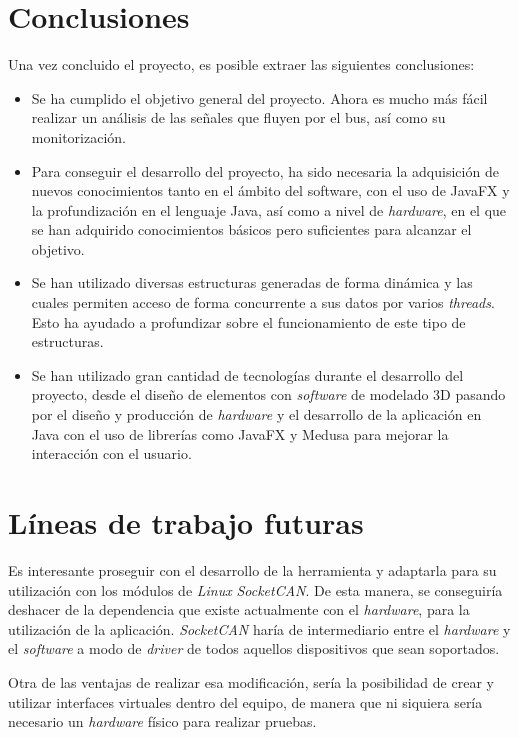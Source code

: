 
\section{Conclusiones}\label{conclusiones}

Una vez concluido el proyecto, es posible extraer las siguientes conclusiones:
\begin{itemize}
\item
Se ha cumplido el objetivo general del proyecto. Ahora es mucho más fácil realizar un análisis de las señales que fluyen por el bus, así como su monitorización.

\item
Para conseguir el desarrollo del proyecto, ha sido necesaria la adquisición de nuevos conocimientos tanto en el ámbito del software, con el uso de JavaFX y la profundización en el lenguaje Java, así como a nivel de \emph{hardware}, en el que se han adquirido conocimientos básicos pero suficientes para alcanzar el objetivo.

\item

Se han utilizado diversas estructuras generadas de forma dinámica y las cuales permiten acceso de forma concurrente a sus datos por varios \emph{threads}. Esto ha ayudado a profundizar sobre el funcionamiento de este tipo de estructuras.

\item
Se han utilizado gran cantidad de tecnologías durante el desarrollo del proyecto, desde el diseño de elementos con \emph{software} de modelado 3D pasando por el diseño y producción de \emph{hardware} y el desarrollo de la aplicación en Java con el uso de librerías como JavaFX y Medusa para mejorar la interacción con el usuario.

\end{itemize}

\newpage
\section{Líneas de trabajo futuras}\label{lineas_de_trabajo_futuras}

Es interesante proseguir con el desarrollo de la herramienta y adaptarla para su utilización con los módulos de \emph{Linux} \emph{SocketCAN}.
De esta manera, se conseguiría deshacer de la dependencia que existe actualmente con el \emph{hardware}, para la utilización de la aplicación. \emph{SocketCAN} haría de intermediario entre el \emph{hardware} y el \emph{software} a modo de \emph{driver} de todos aquellos dispositivos que sean soportados.

Otra de las ventajas de realizar esa modificación, sería la posibilidad de crear y utilizar interfaces virtuales dentro del equipo, de manera que ni siquiera sería necesario un \emph{hardware} físico para realizar pruebas.
